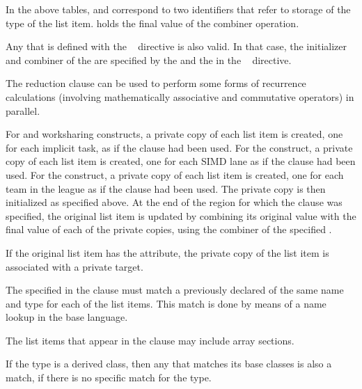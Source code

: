 \linenumbers

\fortranspecificend
\vspace{\baselineskip}

In the above tables,  and  correspond to
two identifiers that refer to storage of the type of the list
item.  holds the final value of the combiner operation.

Any  that is defined with the ~ directive is 
also valid. In that case, the initializer and combiner of the  are 
specified by the  and the  in the ~ 
directive.

\descr
The reduction clause can be used to perform some forms of recurrence calculations 
(involving mathematically associative and commutative operators) in parallel.

For  and worksharing constructs, a private copy of each list item is created, 
one for each implicit task, as if the  clause had been used. For the  
construct, a private copy of each list item is created, one for each SIMD lane as if the 
 clause had been used. For the  construct, a private copy of each list 
item is created, one for each team in the league as if the  clause had been 
used. The private copy is then initialized as specified above. At the end of the region for 
which the  clause was specified, the original list item is updated by 
combining its original value with the final value of each of the private copies, using the 
combiner of the specified .

\fortranspecificstart
If the original list item has the  attribute, the
private copy of the list item is associated with a private target.
\fortranspecificend

The  specified in the  clause must match a previously 
declared  of the same name and type for each of the list items. This 
match is done by means of a name lookup in the base language. 

\ccppspecificstart
The list items that appear in the  clause may include array sections.
\ccppspecificend

\cppspecificstart
If the type is a derived class, then any  that matches its base classes 
is also a match, if there is no specific match for the type.

